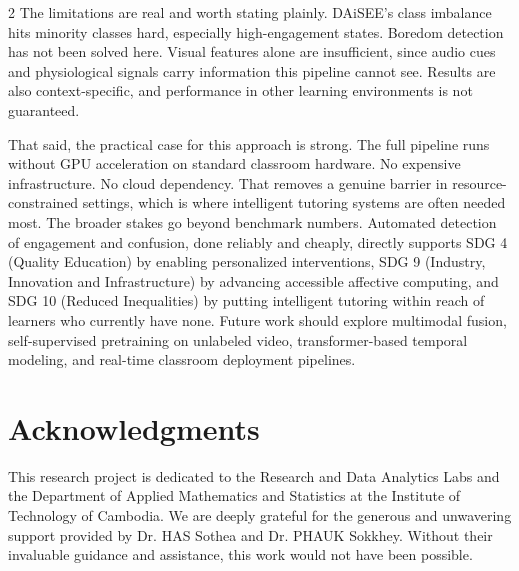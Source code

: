 \begin{multicols}{2}
  The limitations are real and worth stating plainly. DAiSEE's class imbalance hits minority classes hard, especially high-engagement states. Boredom detection has not been solved here. Visual features alone are insufficient, since audio cues and physiological signals carry information this pipeline cannot see. Results are also context-specific, and performance in other learning environments is not guaranteed.

  That said, the practical case for this approach is strong. The full pipeline runs without GPU acceleration on standard classroom hardware. No expensive infrastructure. No cloud dependency. That removes a genuine barrier in resource-constrained settings, which is where intelligent tutoring systems are often needed most. The broader stakes go beyond benchmark numbers. Automated detection of engagement and confusion, done reliably and cheaply, directly supports SDG 4 (Quality Education) by enabling personalized interventions, SDG 9 (Industry, Innovation and Infrastructure) by advancing accessible affective computing, and SDG 10 (Reduced Inequalities) by putting intelligent tutoring within reach of learners who currently have none. Future work should explore multimodal fusion, self-supervised pretraining on unlabeled video, transformer-based temporal modeling, and real-time classroom deployment pipelines.

  \section*{Acknowledgments}

  This research project is dedicated to the Research and Data Analytics Labs and the Department of Applied Mathematics and Statistics at the Institute of Technology of Cambodia. We are deeply grateful for the generous and unwavering support provided by Dr. HAS Sothea and Dr. PHAUK Sokkhey. Without their invaluable guidance and assistance, this work would not have been possible.

  
  

\end{multicols}
